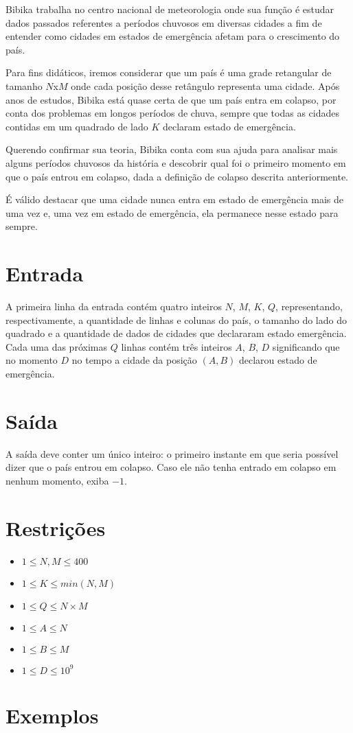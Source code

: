 Bibika trabalha no centro nacional de meteorologia onde sua função é estudar dados passados referentes a períodos chuvosos em diversas cidades a
fim de entender como cidades em estados de emergência afetam para o crescimento do país.

Para fins didáticos, iremos considerar que um país é uma grade retangular de tamanho $N$x$M$ onde cada posição desse retângulo representa uma cidade.
Após anos de estudos, Bibika está quase certa de que um país entra em colapso, por conta dos problemas em longos períodos de chuva, sempre que todas
as cidades contidas em um quadrado de lado $K$ declaram estado de emergência.

Querendo confirmar sua teoria, Bibika conta com sua ajuda para analisar mais alguns períodos chuvosos da história e descobrir qual foi o primeiro momento
em que o país entrou em colapso, dada a definição de colapso descrita anteriormente.

É válido destacar que uma cidade nunca entra em estado de emergência mais de uma vez e, uma vez em estado de emergência, ela permanece nesse estado para sempre.

\section*{Entrada}

A primeira linha da entrada contém quatro inteiros $N$, $M$, $K$, $Q$, representando, respectivamente, a quantidade de linhas e colunas do país,
o tamanho do lado do quadrado e a quantidade de dados de cidades que declararam estado emergência.
Cada uma das próximas $Q$ linhas contém três inteiros $A$, $B$, $D$ significando que no momento $D$ no tempo a cidade da posição $(A,B)$ declarou estado
de emergência.

\section*{Saída}

A saída deve conter um único inteiro: o primeiro instante em que seria possível dizer que o país entrou em colapso. 
Caso ele não tenha entrado em colapso em nenhum momento, exiba $-1$.

\section*{Restrições}

\begin{itemize}
\item $1 \leq N, M \leq 400$
\item $1 \leq K \leq min(N, M)$
\item $1 \leq Q \leq N \times M$
\item $1 \leq A \leq N$
\item $1 \leq B \leq M$
\item $1 \leq D \leq 10^9$
\end{itemize}


\section*{Exemplos}

\exemplo
